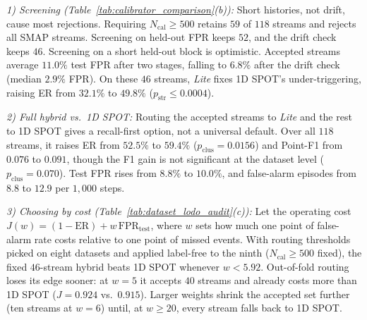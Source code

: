 \noindent\emph{1) Screening (Table~\ref{tab:calibrator_comparison}(b)):} Short histories, not drift, cause most rejections. Requiring $N_{\text{cal}}\ge 500$ retains $59$ of $118$ streams and rejects all SMAP streams. Screening on held-out FPR keeps $52$, and the drift check keeps $46$. Screening on a short held-out block is optimistic. Accepted streams average $11.0\%$ test FPR after two stages, falling to $6.8\%$ after the drift check (median $2.9\%$ FPR). On these $46$ streams, \emph{Lite} fixes 1D SPOT's under-triggering, raising ER from $32.1\%$ to $49.8\%$ ($p_{\text{str}}\le 0.0004$).

\noindent\emph{2) Full hybrid vs.\ 1D SPOT:} Routing the accepted streams to \emph{Lite} and the rest to 1D SPOT gives a recall-first option, not a universal default. Over all $118$ streams, it raises ER from $52.5\%$ to $59.4\%$ ($p_{\text{clus}}=0.0156$) and Point-F1 from $0.076$ to $0.091$, though the F1 gain is not significant at the dataset level ($p_{\text{clus}}=0.070$). Test FPR rises from $8.8\%$ to $10.0\%$, and false-alarm episodes from $8.8$ to $12.9$ per $1{,}000$ steps.

\noindent\emph{3) Choosing by cost (Table~\ref{tab:dataset_lodo_audit}(c)):} Let the operating cost $J(w) = (1 - \text{ER}) + w\,\text{FPR}_{\text{test}}$, where $w$ sets how much one point of false-alarm rate costs relative to one point of missed events. With routing thresholds picked on eight datasets and applied label-free to the ninth ($N_{\text{cal}}\ge 500$ fixed), the fixed $46$-stream hybrid beats 1D SPOT whenever $w<5.92$. Out-of-fold routing loses its edge sooner: at $w=5$ it accepts $40$ streams and already costs more than 1D SPOT ($J=0.924$ vs.\ $0.915$). Larger weights shrink the accepted set further (ten streams at $w=6$) until, at $w\ge 20$, every stream falls back to 1D SPOT.
